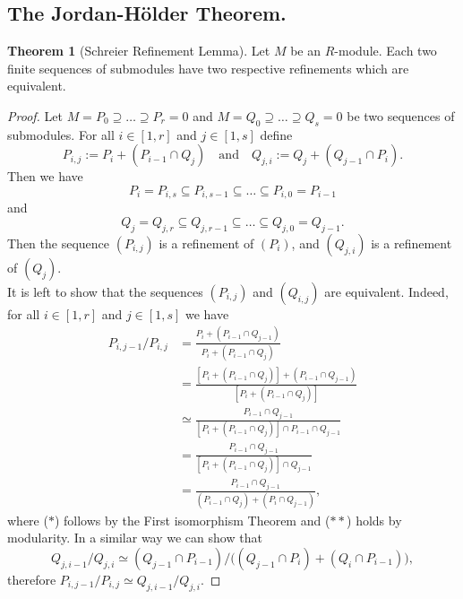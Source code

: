 \documentclass[12pt,a4paper]{report}
\theoremstyle{definition}
\newtheorem{theorem}{Theorem}[chapter] %
\newtheorem*{addendum}{Addendum}
\theoremstyle{num.custom-title}
\DeclareMathOperator{\imp}{\Rightarrow}
\DeclareMathOperator{\sse}{\subseteq}
\begin{document}
\subsection{The Jordan-Hölder Theorem.}

%

\begin{theorem}[Schreier Refinement Lemma]\label{thm-schreier}
Let $M$ be an $R$-module. Each two finite sequences of submodules have two respective refinements which are equivalent.
\begin{proof}
Let $M=P_0 \supseteq \ldots \supseteq P_r = 0$ and $M=Q_0 \supseteq \ldots \supseteq Q_s = 0$ be two sequences of submodules. For all $i \in [1,r]$ and $j \in [1,s]$ define
\[
P_{i,j} := P_i + (P_{i-1} \cap Q_j) \quad \text{and} \quad Q_{j,i} := Q_j + (Q_{j-1} \cap P_i).
\]
Then we have
\[
P_i = P_{i,s} \sse P_{i,s-1} \sse \ldots \sse P_{i,0} = P_{i-1}
\]
and
\[
Q_j = Q_{j,r} \sse Q_{j,r-1} \sse \ldots \sse Q_{j,0} = Q_{j-1}.
\]
Then the sequence $(P_{i,j})$ is a refinement of $(P_i)$, and $(Q_{j,i})$ is a refinement of $(Q_j)$.\\
It is left to show that the sequences $(P_{i,j})$ and $(Q_{i,j})$ are equivalent. Indeed, for all $i \in [1,r]$ and $j \in [1,s]$ we have
\begin{align*}
P_{i,j-1}/P_{i,j} 
&= \frac{P_i + (P_{i-1} \cap Q_{j-1})}{P_i + (P_{i-1} \cap Q_j)} \\
&= \frac{[P_i + (P_{i-1} \cap Q_j)] + (P_{i-1} \cap Q_{j-1})}{[P_i + (P_{i-1} \cap Q_j)]} \\
&\simeq \frac{P_{i-1} \cap Q_{j-1}}{[P_i + (P_{i-1} \cap Q_j)] \cap P_{i-1} \cap Q_{j-1}} \tag{$*$} \\
&= \frac{P_{i-1} \cap Q_{j-1}}{[P_i + (P_{i-1} \cap Q_j)] \cap Q_{j-1}} \\
&= \frac{P_{i-1} \cap Q_{j-1}}{(P_{i-1} \cap Q_j) + (P_i \cap Q_{j-1})}, \tag{$**$}
\end{align*}
where ($*$) follows by the First isomorphism Theorem and ($**$) holds by modularity. In a similar way we can show that
\[
Q_{j,i-1}/Q_{j,i} \simeq (Q_{j-1} \cap P_{i-1}) / \big( (Q_{j-1} \cap P_i) + (Q_i \cap P_{i-1}) \big),
\]
therefore $P_{i,j-1}/P_{i,j} \simeq Q_{j,i-1}/Q_{j,i}$.
\end{proof}
\end{theorem}
\end{document}
